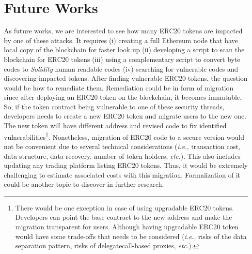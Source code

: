 
\section{Future Works}
As future works, we are interested to see how many ERC20 tokens are impacted by one of these attacks. It requires (i) creating a full Ethereum node that have local copy of the blockchain for faster look up (ii) developing a script to scan the blockchain for ERC20 tokens (iii) using a complementary script to convert byte codes to \textit{Solidity} human readable codes (iv) searching for vulnerable codes and discovering impacted tokens. After finding vulnerable ERC20 tokens, the question would be how to remediate them. Remediation could be in form of migration since after deploying an ERC20 token on the blockchain, it becomes immutable. So, if the token contract being vulnerable to one of these security threads, developers needs to create a new ERC20 token and migrate users to the new one. The new token will have different address and revised code to fix identified vulnerabilities\footnote{There would be one exception in case of using upgradable ERC20 tokens. Developers can point the base contract to the new address and make the migration transparent for users. Although having upgradable ERC20 token would have some trade-offs that needs to be considered (\textit{i.e.,} risks of the data separation pattern, risks of delegatecall-based proxies, \textit{etc.}).}. Nonetheless, migration of ERC20 code to a secure version would not be convenient due to several technical considerations (\textit{i.e.,} transaction cost, data structure, data recovery, number of token holders, \textit{etc.}). This also includes updating any trading platform listing ERC20 tokens. Thus, it would be extremely challenging to estimate associated costs with this migration. Formalization of it could be another topic to discover in further research.
